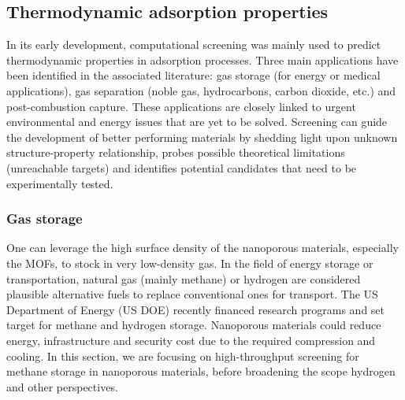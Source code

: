\documentclass[main.tex]{subfiles}
\begin{document}
\subsection{Thermodynamic adsorption properties}

In its early development, computational screening was mainly used to predict thermodynamic properties in adsorption processes. Three main applications have been identified in the associated literature: gas storage (for energy or medical applications), gas separation (noble gas, hydrocarbons, carbon dioxide, etc.) and post-combustion  capture. These applications are closely linked to urgent environmental and energy issues that are yet to be solved. Screening can guide the development of better performing materials by shedding light upon unknown structure-property relationship, probes possible theoretical limitations (unreachable targets) and identifies potential candidates that need to be experimentally tested.

\subsubsection{Gas storage}

One can leverage the high surface density of the nanoporous materials, especially the MOFs, to stock in very low-density gas. In the field of energy storage or transportation, natural gas (mainly methane) or hydrogen are considered plausible alternative fuels to replace conventional ones for transport. The US Department of Energy (US DOE) recently financed research programs and set target for methane and hydrogen storage. Nanoporous materials could reduce energy, infrastructure and security cost due to the required compression and cooling. In this section, we are focusing on high-throughput screening for methane storage in nanoporous materials, before broadening the scope hydrogen and other perspectives.
\end{document}
